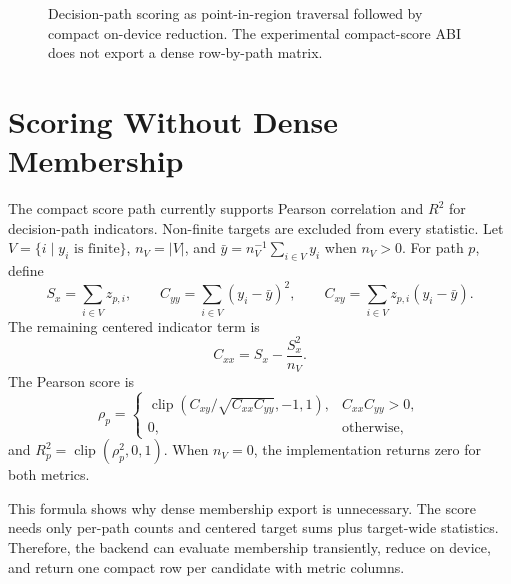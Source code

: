 \documentclass[11pt]{article}
\begin{document}
\begin{figure}[t]
\centering
\fbox{\begin{minipage}{0.92\linewidth}
\[
\begin{array}{rcl}
\text{GBDT path} &:& x_{f_0} > a \ \wedge \ x_{f_1} \le b \\
\text{Region}   &:& (a,\infty) \times (-\infty,b] \\
\text{Row}      &:& q_i=(X_{i,f_0},X_{i,f_1}) \\
\text{Score}    &:& \rho(z_p,y) \text{ or } R^2(z_p,y)
\end{array}
\]
\[
\text{candidate descriptors}
\rightarrow
\text{RT traversal}
\rightarrow
\text{on-device counts/sums}
\rightarrow
\text{compact result rows.}
\]
\end{minipage}}
\caption{Decision-path scoring as point-in-region traversal followed by compact
on-device reduction. The experimental compact-score ABI does not export a
dense row-by-path matrix.}
\label{fig:mapping}
\end{figure}

\section{Scoring Without Dense Membership}

The compact score path currently supports Pearson correlation and $R^2$ for
decision-path indicators. Non-finite targets are excluded from every statistic.
Let $V=\{i\mid y_i\text{ is finite}\}$, $n_V=|V|$, and
$\bar y=n_V^{-1}\sum_{i\in V}y_i$ when $n_V>0$. For path $p$, define
\[
  S_x = \sum_{i\in V} z_{p,i}, \qquad
  C_{yy} = \sum_{i\in V}(y_i-\bar y)^2, \qquad
  C_{xy} = \sum_{i\in V}z_{p,i}(y_i-\bar y).
\]
The remaining centered indicator term is
\[
  C_{xx}=S_x-\frac{S_x^2}{n_V}.
\]
The Pearson score is
\[
  \rho_p =
  \begin{cases}
    \operatorname{clip}\left(C_{xy}/\sqrt{C_{xx}C_{yy}},-1,1\right),
      & C_{xx}C_{yy}>0,\\
    0, & \text{otherwise,}
  \end{cases}
\]
and $R^2_p=\operatorname{clip}(\rho_p^2,0,1)$. When $n_V=0$, the
implementation returns zero for both metrics.

This formula shows why dense membership export is unnecessary. The score needs
only per-path counts and centered target sums plus target-wide statistics. Therefore,
the backend can evaluate membership transiently, reduce on device, and return
one compact row per candidate with metric columns.
\end{document}
